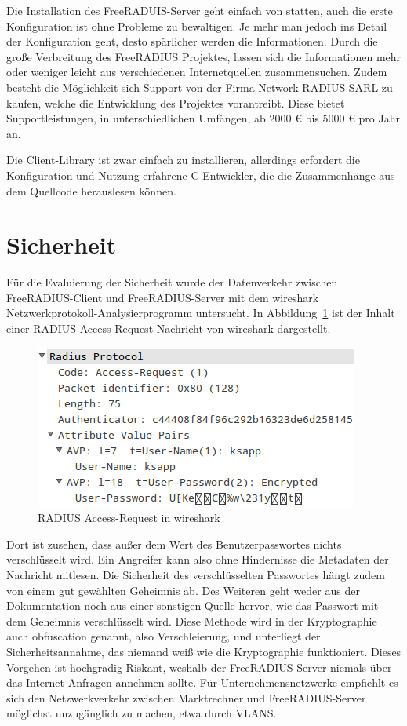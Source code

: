 \documentclass[11pt,a4paper]{report}
\begin{document}
Die Installation des FreeRADUIS-Server geht einfach von statten, auch die erste Konfiguration ist ohne Probleme zu bewältigen. Je mehr man jedoch ins Detail der Konfiguration geht, desto spärlicher werden die Informationen. Durch die große Verbreitung des FreeRADIUS Projektes, lassen sich die Informationen mehr oder weniger leicht aus verschiedenen Internetquellen zusammensuchen. Zudem besteht die Möglichkeit sich Support von der Firma Network RADIUS SARL zu kaufen, welche die Entwicklung des Projektes vorantreibt. Diese bietet Supportleistungen, in unterschiedlichen Umfängen, ab 2000 € bis 5000 € pro Jahr an.

Die Client-Library ist zwar einfach zu installieren, allerdings erfordert die Konfiguration und Nutzung erfahrene C-Entwickler, die die Zusammenhänge aus dem Quellcode herauslesen können. 

\section{Sicherheit}

Für die Evaluierung der Sicherheit wurde der Datenverkehr zwischen FreeRADIUS-Client und FreeRADIUS-Server mit dem wireshark Netzwerkprotokoll-Analysierprogramm untersucht. In Abbildung~\ref{fig:radius_wire} ist der Inhalt einer RADIUS Access-Request-Nachricht von wireshark dargestellt.

\begin{figure}[htbp]
\centering
\includegraphics[scale=1]{images/radius_request_wireshark.png}
\caption{RADIUS Access-Request in wireshark}
\label{fig:radius_wire}
\end{figure}

Dort ist zusehen, dass außer dem Wert des Benutzerpasswortes nichts verschlüsselt wird. Ein Angreifer kann also ohne Hindernisse die Metadaten der Nachricht mitlesen. Die Sicherheit des verschlüsselten Passwortes hängt zudem von einem gut gewählten Geheimnis ab. Des Weiteren geht weder aus der Dokumentation noch aus einer sonstigen Quelle hervor, wie das Passwort mit dem Geheimnis verschlüsselt wird. Diese Methode wird in der Kryptographie auch obfuscation genannt, also Verschleierung, und unterliegt der Sicherheitsannahme, das niemand weiß wie die Kryptographie funktioniert. Dieses Vorgehen ist hochgradig Riskant, weshalb der FreeRADIUS-Server niemals über das Internet Anfragen annehmen sollte. Für Unternehmensnetzwerke empfiehlt es sich den Netzwerkverkehr zwischen Marktrechner und FreeRADIUS-Server möglichst unzugänglich zu machen, etwa durch VLANS.
\end{document}
